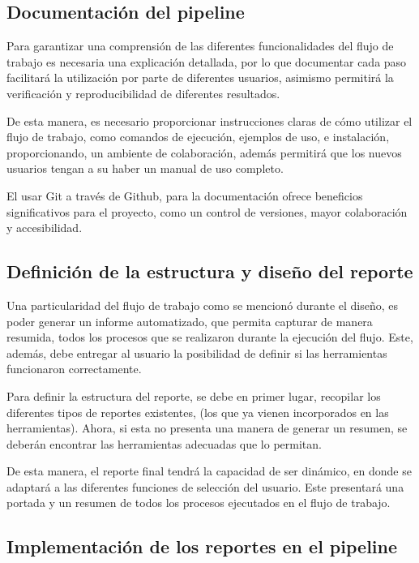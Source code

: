 \documentclass[12pt]{article}
\begin{document}
\subsection*{Documentación del pipeline}

Para garantizar una comprensión de las diferentes funcionalidades 
del flujo de trabajo es necesaria una explicación detallada, por 
lo que documentar cada paso facilitará la utilización por parte 
de diferentes usuarios, asimismo permitirá la verificación y 
reproducibilidad de diferentes resultados.

De esta manera, es necesario proporcionar instrucciones 
claras de cómo utilizar el flujo de trabajo, como comandos 
de ejecución, ejemplos de uso, e instalación, proporcionando, un 
ambiente de colaboración, además permitirá  que los nuevos usuarios 
tengan a su haber un manual de uso completo.

El usar Git a través de Github, para la documentación ofrece 
beneficios significativos para el proyecto, como un control de 
versiones, mayor colaboración y accesibilidad.

\subsection*{Definición de la estructura y diseño del reporte}

Una particularidad del flujo de trabajo como se mencionó durante 
el diseño, es poder generar un informe automatizado, que permita 
capturar de manera resumida, todos los procesos que se realizaron 
durante la ejecución del flujo. Este, además, debe entregar  al 
usuario la posibilidad de definir si las herramientas funcionaron 
correctamente.

Para definir la estructura del reporte, se debe en primer lugar, 
recopilar los diferentes tipos de reportes existentes, 
(los que ya vienen incorporados en las herramientas). Ahora, 
si esta no presenta una manera de generar un resumen, se deberán 
encontrar las  herramientas  adecuadas que lo permitan.

De esta manera, el reporte final tendrá la capacidad de ser 
dinámico, en donde se adaptará a las diferentes funciones de 
selección del usuario. Este presentará una portada  y un resumen 
de todos los procesos ejecutados en el flujo de trabajo.

\subsection*{Implementación de los reportes en el pipeline}
\end{document}
